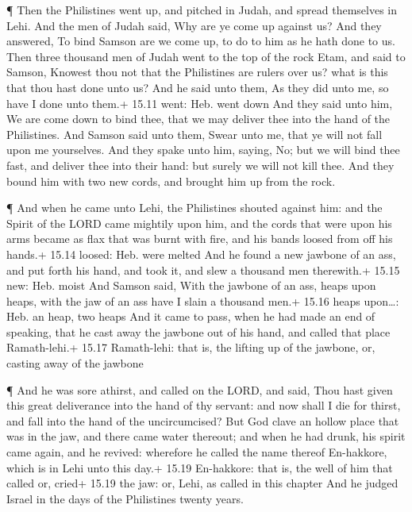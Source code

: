  ¶ Then the Philistines went up, and pitched in Judah, and
spread themselves in Lehi.  And the men of Judah said, Why
are ye come up against us? And they answered, To bind Samson are we come
up, to do to him as he hath done to us.  Then three
thousand men of Judah went to the top of the rock Etam, and said to
Samson, Knowest thou not that the Philistines are rulers over us? what
is this that thou hast done unto us? And he said unto them, As they did
unto me, so have I done unto them.+ 15.11 went: Heb. went down
 And they said unto him, We are come down to bind thee,
that we may deliver thee into the hand of the Philistines. And Samson
said unto them, Swear unto me, that ye will not fall upon me yourselves.
 And they spake unto him, saying, No; but we will bind thee
fast, and deliver thee into their hand: but surely we will not kill
thee. And they bound him with two new cords, and brought him up from the
rock.

 ¶ And when he came unto Lehi, the Philistines shouted
against him: and the Spirit of the LORD came mightily upon him, and the
cords that were upon his arms became as flax that was burnt with fire,
and his bands loosed from off his hands.+ 15.14 loosed: Heb. were melted
 And he found a new jawbone of an ass, and put forth his
hand, and took it, and slew a thousand men therewith.+ 15.15 new: Heb.
moist  And Samson said, With the jawbone of an ass, heaps
upon heaps, with the jaw of an ass have I slain a thousand men.+ 15.16
heaps upon\ldots: Heb. an heap, two heaps  And it came to
pass, when he had made an end of speaking, that he cast away the jawbone
out of his hand, and called that place Ramath-lehi.+ 15.17 Ramath-lehi:
that is, the lifting up of the jawbone, or, casting away of the jawbone

 ¶ And he was sore athirst, and called on the LORD, and
said, Thou hast given this great deliverance into the hand of thy
servant: and now shall I die for thirst, and fall into the hand of the
uncircumcised?  But God clave an hollow place that was in
the jaw, and there came water thereout; and when he had drunk, his
spirit came again, and he revived: wherefore he called the name thereof
En-hakkore, which is in Lehi unto this day.+ 15.19 En-hakkore: that is,
the well of him that called or, cried+ 15.19 the jaw: or, Lehi, as
called in this chapter  And he judged Israel in the days of
the Philistines twenty years.

